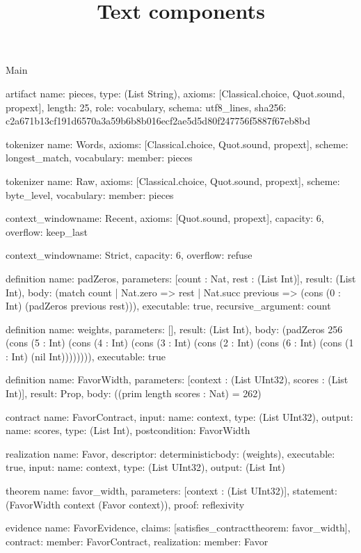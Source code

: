 \begin{lexlean}{Main}
\title{Text components}
\begin{semanticmodule}
artifact{
  name: pieces,
  type: (List String),
  axioms: [Classical.choice, Quot.sound, propext],
  length: 25,
  role: vocabulary,
  schema: utf8_lines{},
  sha256: c2a671b13cf191d6570a3a59b6b8b016ecf2ae5d5d80f247756f5887f67eb8bd
}

tokenizer{
  name: Words,
  axioms: [Classical.choice, Quot.sound, propext],
  scheme: longest_match,
  vocabulary: {member: pieces}
}

tokenizer{
  name: Raw,
  axioms: [Classical.choice, Quot.sound, propext],
  scheme: byte_level,
  vocabulary: {member: pieces}
}

context_window{name: Recent, axioms: [Quot.sound, propext], capacity: 6, overflow: keep_last}

context_window{name: Strict, capacity: 6, overflow: refuse}

definition{
  name: padZeros,
  parameters: [count : Nat, rest : (List Int)],
  result: (List Int),
  body: (match count
    | Nat.zero => rest
    | Nat.succ previous => (cons (0 : Int) (padZeros previous rest))),
  executable: true,
  recursive_argument: count
}

definition{
  name: weights,
  parameters: [],
  result: (List Int),
  body: (padZeros 256 (cons (5 : Int) (cons (4 : Int) (cons (3 : Int) (cons (2 : Int) (cons (6 : Int) (cons (1 : Int) (nil Int)))))))),
  executable: true
}

definition{
  name: FavorWidth,
  parameters: [context : (List UInt32), scores : (List Int)],
  result: Prop,
  body: ((prim length scores : Nat) = 262)
}

contract{
  name: FavorContract,
  input: {name: context, type: (List UInt32)},
  output: {name: scores, type: (List Int)},
  postcondition: FavorWidth
}

realization{
  name: Favor,
  descriptor: deterministic{body: (weights)},
  executable: true,
  input: {name: context, type: (List UInt32)},
  output: (List Int)
}

theorem{
  name: favor_width,
  parameters: [context : (List UInt32)],
  statement: (FavorWidth context (Favor context)),
  proof: reflexivity{}
}

evidence{
  name: FavorEvidence,
  claims: [satisfies_contract{theorem: favor_width}],
  contract: {member: FavorContract},
  realization: {member: Favor}
}


\end{semanticmodule}
\end{lexlean}
